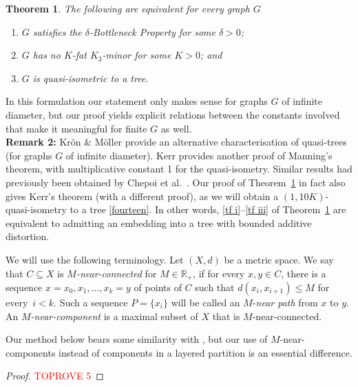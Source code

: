 \documentclass[a4paper]{article}
\newcommand{\Debug}{0}
\newcommand{\comment}[1]{}
\newcommand{\defi}[1]{{\color{darkgray}\emph{#1}}}
\newtheorem{theorem}[proposition]{Theorem}
\newtheorem{corollary}[proposition]{Corollary}
\newcommand{\N}{\ensuremath{\mathbb N}}
\newcommand{\R}{\ensuremath{\mathbb R}}
\newcommand{\Tr}[1]{Theorem~\ref{#1}}
\newcommand{\fe}{for every}
\newcommand{\mymargin}[1]{\ifnum \Debug = 1
  \marginpar{\begin{minipage}{\marginparwidth}\small \begin{flushleft}{\color{blue}#1}\end{flushleft}\end{minipage}}\fi
}
\newcommand{\ncm}{near-component}
\newcommand{\fan}{\mathrm{Fan}}
\begin{document}
\begin{theorem} \label{triangle-free}
The following are equivalent for every graph $G$
\begin{enumerate}
\item \label{tf i} $G$ satisfies the $\delta$-Bottleneck Property for some $\delta>0$;
\item \label{tf ii} $G$ has no $K$-fat $K_3$-minor for some $K>0$; and
\item \label{tf iii} $G$ is quasi-isometric to a tree.
\end{enumerate}
\end{theorem}
 In this formulation our statement only makes sense for graphs $G$ of infinite diameter, but our proof yields explicit relations between the constants involved that make it meaningful for finite $G$ as well. \\
{\bf Remark 2:} Kr\"on \& M\"oller \cite{KroMolQua} provide an alternative characterisation of quasi-trees (for graphs $G$ of infinite diameter). Kerr \cite{KerTre} provides another proof of Manning's theorem, with multiplicative constant 1 for the quasi-isometry. Similar results had previously been obtained by Chepoi et al.\ \cite{CDNRV}. Our proof of \Tr{triangle-free} in fact also gives Kerr's theorem (with a different proof), as we will obtain a $(1,10K)$-quasi-isometry to a tree \eqref{fourteen}.  In other words, \ref{tf i}--\ref{tf iii} of \Tr{triangle-free} are equivalent to admitting an embedding into a tree with bounded additive distortion. 

\medskip
We will use the following terminology. Let $(X,d)$ be a metric space. We say that $C\subseteq X$ is \defi{$M$-near-connected} for $M\in \R_+$, if for every $x,y\in C$, there is a sequence $x=x_0,x_1, \ldots, x_k=y$ of points of $C$ such that $d(x_i,x_{i+1})\leq M$ \fe\ $i<k$. Such a sequence $P=\{x_i\}$ will be called an $M$-\defi{near path} from $x$ to $y$. An \defi{$M$-\ncm} is a maximal subset of $X$ that is $M$-near-connected. 

Our method below bears some similarity with \cite{CDNRV}, but our use of $M$-\ncm s instead of components in a layered partition is an essential difference. 

\begin{proof}\textcolor{red}{TOPROVE 5}\end{proof}

\comment{
The \defi{$k$-fan} $\fan_k$ is the graph obtained from a path $P$ of $k$ vertices by adding a new vertex and joining it to \mymargin{new paragraph} each vertex of $P$ with an edge. By a straightforward modification of the above proof we will obtain the following fact 
\begin{corollary} \label{corol fan}
Let $G$ be a graph with no $K$-fat $\fan_k$-minor, and $M\in \N_*$. Then there is $D=D(K,k,M)$ such that each $MK$-near-component of any `sphere' $S_n, n\in \N$ (defined as above) has diameter at most $D$.
\end{corollary}
\begin{proof}\textcolor{red}{TOPROVE 6}\end{proof}
}
\end{document}
